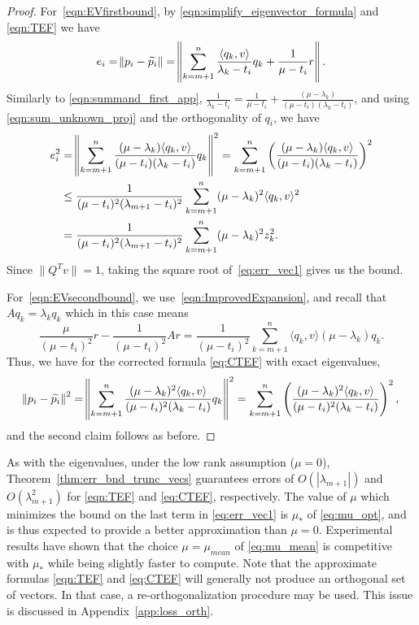 \documentclass[11pt]{article}
\begin{document}
\begin{proof}
For~\eqref{eqn:EVfirstbound}, by \eqref{eqn:simplify_eigenvector_formula} and \eqref{eqn:TEF} we have 
\begin{equation*}
e_i = \norm{p_i- \widetilde{p_i}} = \norm{\sum_{k=m+1}^{n} \frac{\langle q_k, v \rangle}{\lambda_k - t_i}q_k + \frac{1}{\mu - t_i}r }.
\end{equation*}
Similarly to \eqref{eqn:summand_first_app},
  $\frac{1}{\lambda_k - t_i} = \frac{1}{\mu-t_i} +  \frac{(\mu - \lambda_k)}{(\mu-t_i)(\lambda_k - t_i)}$, and using \eqref{eqn:sum_unknown_proj} and the orthogonality of $q_i$, we have
\begin{align}   \label{eq:err_vec1}
e_i^2  & =   \norm{\sum_{k=m+1}^{n} \frac{(\mu - \lambda_k) \langle q_k, v \rangle}{(\mu - t_i)(\lambda_k - t_i)}q_k  }^2 \nonumber  = \sum_{k=m+1}^{n} \left( \frac{(\mu - \lambda_k) \langle q_k, v \rangle}{(\mu - t_i)(\lambda_k - t_i)} \right)^2\nonumber  \\
& \leq \frac{1}{(\mu - t_i)^2(\lambda_{m+1} - t_i)^2} \sum_{k=m+1}^{n}  (\mu - \lambda_k)^2 \langle q_k, v \rangle ^2 \nonumber  \\
& = \frac{1}{(\mu - t_i)^2(\lambda_{m+1} - t_i)^2} \sum_{k=m+1}^{n}  (\mu - \lambda_k)^2 z_k^2 .    
\end{align}   
Since $\|Q^Tv\| = 1$, taking the square root of~\eqref{eq:err_vec1} gives us the bound.

For~\eqref{eqn:EVsecondbound}, we use~\eqref{eqn:ImprovedExpansion}, and recall that $Aq_k = \lambda_kq_k$ which in this case means
\begin{equation*}
\frac{\mu}{(\mu - t_i)^2}r - \frac{1}{(\mu - t_i)^2}Ar = \frac{1}{(\mu - t_i)^2} \sum_{k=m+1}^{n} \langle q_k, v \rangle (\mu - \lambda_k) q_k    .
\end{equation*}
Thus, we have for the corrected formula \eqref{eq:CTEF} with exact eigenvalues,
\begin{equation}
\norm{p_i- \widetilde{p_i}}^2  = \norm{\sum_{k=m+1}^{n} \frac{(\mu - \lambda_k)^2 \langle q_k, v \rangle}{(\mu - t_i)^2(\lambda_k - t_i)}q_k  }^2 = \sum_{k=m+1}^{n} \left( \frac{(\mu - \lambda_k)^2 \langle q_k, v \rangle}{(\mu - t_i)^2(\lambda_k - t_i)} \right)^2   , \end{equation}
and the second claim follows as before.
\end{proof}

As with the eigenvalues, under the low rank assumption ($\mu = 0$), Theorem~\ref{thm:err_bnd_trunc_vecs} guarantees errors of $O(|\lambda_{m+1}|)$ and $O(\lambda_{m+1}^2)$ for \eqref{eqn:TEF} and \eqref{eq:CTEF}, respectively. The value of $\mu$ which minimizes the bound on the last term in \eqref{eq:err_vec1} is $\mu_\ast$ of \eqref{eq:mu_opt}, and is thus expected to provide a better approximation than $\mu = 0$. Experimental results have shown that the choice $\mu = \mu_{mean}$ of \eqref{eq:mu_mean} is competitive with $\mu_\ast$ while being slightly faster to compute. Note that the approximate formulas \eqref{eqn:TEF} and \eqref{eq:CTEF} will generally not produce an orthogonal set of vectors. In that case, a re-orthogonalization procedure may be used. This issue is discussed in Appendix~\ref{app:loss_orth}.
\end{document}
